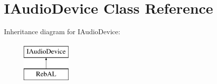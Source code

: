 \hypertarget{class_i_audio_device}{}\section{I\+Audio\+Device Class Reference}
\label{class_i_audio_device}
Inheritance diagram for I\+Audio\+Device\+:\begin{figure}[H]
\begin{center}
\leavevmode
\includegraphics[height=2.000000cm]{class_i_audio_device}
\end{center}
\end{figure}
